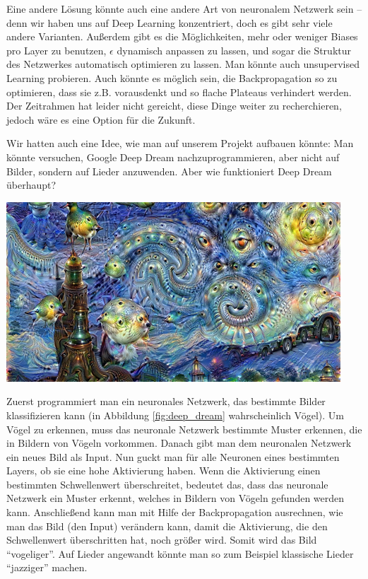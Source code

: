 \documentclass[11pt, a4paper, ngerman]{article}
\begin{document}
	Eine andere Lösung könnte auch eine andere Art von neuronalem Netzwerk sein -- denn wir haben uns auf Deep Learning konzentriert, doch es gibt sehr viele andere Varianten. Außerdem gibt es die Möglichkeiten, mehr oder weniger Biases pro Layer zu benutzen, $\epsilon$ dynamisch anpassen zu lassen, und sogar die Struktur des Netzwerkes automatisch optimieren zu lassen. Man könnte auch unsupervised Learning probieren. Auch könnte es möglich sein, die Backpropagation so zu optimieren, dass sie z.B. vorausdenkt und so flache Plateaus verhindert werden. Der Zeitrahmen hat leider nicht gereicht, diese Dinge weiter zu recherchieren, jedoch wäre es eine Option für die Zukunft.
	
	Wir hatten auch eine Idee, wie man auf unserem Projekt aufbauen könnte: Man könnte versuchen, Google Deep Dream nachzuprogrammieren, aber nicht auf Bilder, sondern auf Lieder anzuwenden. Aber wie funktioniert Deep Dream überhaupt?
	
	\vspace{1.25ex}
	\begingroup
	\noindent \includegraphics[width=\linewidth]{pictures/deep_dream.png}
	\label{fig:deep_dream}
	\endgroup
	\vspace{1.25ex}
	
	Zuerst programmiert man ein neuronales Netzwerk, das bestimmte Bilder klassifizieren kann (in Abbildung \ref{fig:deep_dream} wahrscheinlich Vögel). Um Vögel zu erkennen, muss das neuronale Netzwerk bestimmte Muster erkennen, die in Bildern von Vögeln vorkommen. Danach gibt man dem neuronalen Netzwerk ein neues Bild als Input. Nun guckt man für alle Neuronen eines bestimmten Layers, ob sie eine hohe Aktivierung haben. Wenn die Aktivierung einen bestimmten Schwellenwert überschreitet, bedeutet das, dass das neuronale Netzwerk ein Muster erkennt, welches in Bildern von Vögeln gefunden werden kann. Anschließend kann man mit Hilfe der Backpropagation ausrechnen, wie man das Bild (den Input) verändern kann, damit die Aktivierung, die den Schwellenwert überschritten hat, noch größer wird. Somit wird das Bild \enquote{vogeliger}. Auf Lieder angewandt könnte man so zum Beispiel klassische Lieder \enquote{jazziger} machen.
\end{document}
